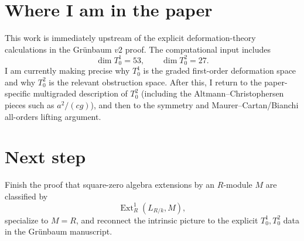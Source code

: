 \documentclass[11pt]{article}
\begin{document}
\section*{Where I am in the paper}
This work is immediately upstream of the explicit deformation-theory calculations in the Grünbaum \(v2\) proof. The computational input includes
$$
\dim T^1_0=53,\qquad \dim T^2_0=27.
$$
I am currently making precise why \(T^1_0\) is the graded first-order deformation space and why \(T^2_0\) is the relevant obstruction space. After this, I return to the paper-specific multigraded description of \(T^2_0\) (including the Altmann--Christophersen pieces such as \(a^2/(cg)\)), and then to the symmetry and Maurer--Cartan/Bianchi all-orders lifting argument.

\section*{Next step}
Finish the proof that square-zero algebra extensions by an \(R\)-module \(M\) are classified by
$$
\operatorname{Ext}^1_R(L_{R/k},M),
$$
specialize to \(M=R\), and reconnect the intrinsic picture to the explicit \(T^1_0,T^2_0\) data in the Grünbaum manuscript.
\end{document}
